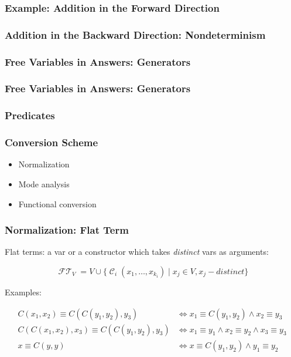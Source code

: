 \documentclass[xcolor=table]{beamer}
\DeclareMathOperator{\FlatTerm}{\mathcal{FT}}
\DeclareMathOperator{\Cons}{\mathcal{C}}
\begin{document}
\lstset{basicstyle=\small}

\begin{frame}[fragile]
  \frametitle{Example: Addition in the Forward Direction}



\end{frame}

\begin{frame}[fragile]
  \frametitle{Addition in the Backward Direction: Nondeterminism}



\end{frame}

\begin{frame}[fragile]
  \frametitle{Free Variables in Answers: Generators}

\end{frame}

\begin{frame}[fragile]
  \frametitle{Free Variables in Answers: Generators}

\end{frame}

\begin{frame}[fragile]
  \frametitle{Predicates}
  

  
\end{frame}



\begin{frame}[fragile]
  \frametitle{Conversion Scheme}
  \begin{itemize}
    \item Normalization
    \item Mode analysis
    \item Functional conversion
  \end{itemize}
\end{frame}


\begin{frame}[fragile]
  \frametitle{Normalization: Flat Term}

Flat terms: a var or a constructor which takes \emph{distinct} vars as arguments:

  \[  \FlatTerm_{V} = V \cup \{\Cons_{i}\left( x_1, \ldots, x_{k_{i}} \right) \mid x_{j}\in V, x_j - distinct \} \]

Examples:

\begin{equation*}
\begin{split}
 C\left( x_1, x_2 \right) \equiv C\left( C\left( y_1, y_2 \right), y_3 \right) & \iff x_1 \equiv C\left( y_1, y_2 \right) \land x_2 \equiv y_3 \\
 C\left( C\left( x_1, x_2 \right), x_3 \right) \equiv C\left( C\left( y_1, y_2 \right), y_3 \right) & \iff x_1 \equiv y_1 \land x_2 \equiv y_2 \land x_3 \equiv y_3 \\
 x \equiv C\left( y, y \right) & \iff x \equiv C\left( y_1, y_2 \right)\land y_1 \equiv y_2
\end{split}
\end{equation*}
\end{frame}
\end{document}

